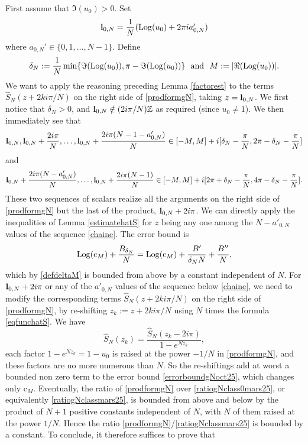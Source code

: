 \documentclass[11pt]{amsart}
\newcommand{\Z}{\mathbb{Z}}
\newcommand{\bl}{{\bf l}}
\newcommand{\Log}{{\rm Log}}
\begin{document}
{\proof First assume that $\Im(u_0) > 0$. Set
$$\textstyle \bl_{0,N} = \dfrac{1}{N}(\Log(u_{0})+2\pi i a_{0,N}' )$$
where $a_{0,N}'\in \{0, 1, \ldots, N-1\}$. Define
\begin{equation}\label{defdeltaM}
\delta_N:= \dfrac{1}{N}\min\{\Im(\Log(u_0)), \pi - \Im(\Log(u_0))\} \ \ \text{and} \ \ M:= |\Re(\Log(u_0))|.
\end{equation}
We want to apply the reasoning preceding Lemma \ref{factorest} to the terms $\hat S_N\left(z+2ki\pi/N\right)$ on the right side of \eqref{prodformgN}, taking $z=\bl_{0,N}$. We first notice that $\delta_N>0$, and $\bl_{0,N} \notin (2 i \pi/N) \Z$ as required (since $u_0\ne 1$). We then immediately see that
\begin{equation}\label{chaine}
\bl_{0,N}, \bl_{0,N} + \frac{2i\pi}{N}, \ldots,  \bl_{0,N} + \frac{2i\pi(N-1-a'_{0,N})}{N} \in [-M,M]+i[\delta_N-\frac{\pi}{N},2\pi - \delta_N-\frac{\pi}{N}]
\end{equation}
and
$$ \bl_{0,N} + \frac{2i\pi(N-a'_{0,N})}{N}, \ldots,  \bl_{0,N} + \frac{2i\pi(N-1)}{N} \in [-M,M]+i[2\pi+\delta_N-\frac{\pi}{N},4\pi - \delta_N-\frac{\pi}{N}].$$
These two sequences of scalars realize all the arguments on the right side of \eqref{prodformgN} but the last of the product, $ \bl_{0,N} + 2i\pi$. We can directly apply the inequalities of Lemma \ref{estimatehatS} for $z$ being any one among the $N-a'_{0,N}$ values of the sequence \eqref{chaine}. The error bound is 
\begin{equation}\label{errorboundgNoct25}
\Log(\mathrm{c}_M)+ \dfrac{B_{\delta_N}}{N} = \Log(\mathrm{c}_M) + \dfrac{B'}{\delta_N N} + \dfrac{B''}{N},
\end{equation}
which by \eqref{defdeltaM} is bounded from above by a constant independent of $N$. For $\bl_{0,N} + 2i\pi$ or any of the $a'_{0,N}$ values of the sequence below \eqref{chaine}, we need to modify the corresponding terms $\hat S_N\left(z+2ki\pi/N\right)$ on the right side of \eqref{prodformgN}, by re-shifting $z_k:=z+2ki\pi/N$ using $N$ times the formula \eqref{eqfunchatS}. We have
$$\hat{S}_N(z_k) = \dfrac{\hat{S}_N(z_k-2i\pi)}{1-e^{Nz_k}},$$
each factor $1-e^{Nz_k} = 1-u_0$ is raised at the power $-1/N$ in \eqref{prodformgN}, and these factors are no more numerous than $N$. So the re-shiftings add at worst a bounded non zero term to the error bound \eqref{errorboundgNoct25}, which changes only $\mathrm{c}_M$. Eventually, the ratio of \eqref{prodformgN} over \eqref{ratiogNclass0mars25}, or equivalently \eqref{ratiogNclassmars25}, is bounded from above and below by the product of $N+1$ positive constants independent of $N$, with $N$ of them raised at the power $1/N$. Hence the ratio \eqref{prodformgN}/\eqref{ratiogNclassmars25} is bounded by a constant. To conclude, it therefore suffices to prove that
}
\end{document}
